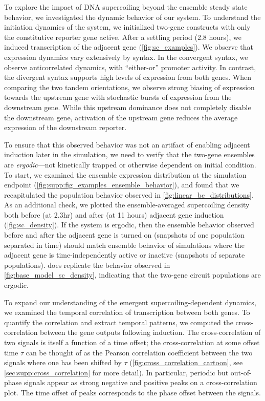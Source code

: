 \documentclass[11pt]{article}
\begin{document}
To explore the impact of DNA supercoiling beyond the ensemble steady state behavior, we investigated the dynamic behavior of our system. To understand the initiation dynamics of the system, we initialized two-gene constructs with only the constitutive reporter gene active. After a settling period (2.8 hours), we induced transcription of the adjacent gene (\cref{fig:sc_examples}).
We observe that expression dynamics vary extensively by syntax. In the convergent syntax, we observe anticorrelated dynamics, with ``either-or'' promoter activity. In contrast, the divergent syntax supports high levels of expression from both genes. When comparing the two tandem orientations, we observe strong biasing of expression towards the upstream gene with stochastic bursts of expression from the downstream gene. While this upstream dominance does not completely disable the downstream gene, activation of the upstream gene reduces the average expression of the downstream reporter. 

To ensure that this observed behavior was not an artifact of enabling adjacent induction later in the simulation, we need to verify that the two-gene ensembles are \emph{ergodic}---not kinetically trapped or otherwise dependent on initial condition. To start, we examined the ensemble expression distribution at the simulation endpoint (\cref{fig:supp:fig_examples_ensemble_behavior}), and found that we recapitulated the population behavior observed in \cref{fig:linear_bc_distributions}. As an additional check, we plotted the ensemble-averaged supercoiling density both before (at 2.3hr) and after (at 11 hours) adjacent gene induction (\cref{fig:sc_density}). If the system is ergodic, then the ensemble behavior observed before and after the adjacent gene is turned on (snapshots of one population separated in time) should match ensemble behavior of simulations where the adjacent gene is time-independently active or inactive (snapshots of separate populations).  does replicate the behavior observed in \cref{fig:base_model_sc_density}, indicating that the two-gene circuit populations are ergodic.
 

To expand our understanding of the emergent supercoiling-dependent dynamics, we examined the temporal correlation of transcription between both genes. To quantify the correlation and extract temporal patterns, we computed the cross-correlation between the gene outputs following induction. The cross-correlation of two signals is itself a function of a time offset; the cross-correlation at some offset time \(\tau\) can be thought of as the Pearson correlation coefficient between the two signals where one has been shifted by \(\tau\) (\cref{fig:cross_correlation_cartoon}, see \cref{sec:supp:cross_correlation} for more detail). In particular, periodic but out-of-phase signals appear as strong negative and positive peaks on a cross-correlation plot.  The time offset of peaks corresponds to the phase offset between the signals.
\end{document}
